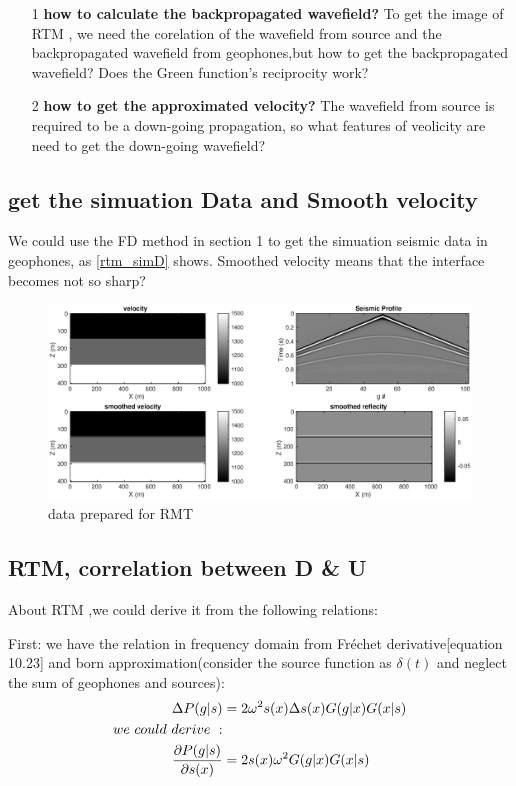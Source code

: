 \documentclass[a4paper]{article}
\begin{document}
	\begin{itemize}
		\item[1] \textbf{how to calculate the backpropagated wavefield?} To get the image of RTM , we need the corelation of the wavefield from source and the backpropagated wavefield from geophones,but how to get the backpropagated wavefield? Does the Green function's reciprocity work?
		\item[2] \textbf{how to get the approximated velocity?} The wavefield from source is required to be a down-going propagation, so what features of veolicity are need to get the down-going wavefield?
	\end{itemize}

	\subsection{get the simuation Data and Smooth velocity}

	We could use the FD method in section 1 to get the simuation seismic data in geophones, as \autoref{rtm_simD} shows. Smoothed velocity means that the interface becomes not so sharp?

	\begin{figure}[ht]
		\centering
		\includegraphics[width=1\linewidth]{./fig/rtm_simuationData.eps}
		\caption{data prepared for RMT}
		\label{rtm_simD}
	\end{figure}

	\subsection{RTM, correlation between D \& U}

	About RTM ,we could derive it from the following relations:\par
	First: we have the relation in frequency domain from  Fréchet derivative\cite{SI}[equation 10.23] and born approximation(consider the source function as $\delta(t)$ and neglect the sum of geophones and sources):
	\begin{align}
		\Delta P(g|s)& =2\omega^2s(x)\Delta s(x)G(g|x)G(x|s)\\
		we\ could\ derive\ :&\notag\\
		\frac{\partial P(g|s)}{\partial s(x)}&=2s(x)\omega^2G(g|x)G(x|s) \label{FE}
	\end{align}
\end{document}
